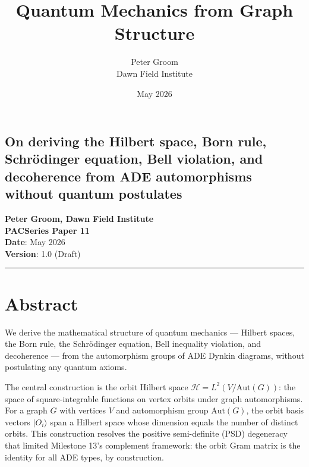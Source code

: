 \documentclass[11pt,a4paper]{article}
\title{Quantum Mechanics from Graph Structure}
\author{Peter Groom \\ Dawn Field Institute}
\date{May 2026}
\begin{document}
\maketitle

\subsection*{On deriving the Hilbert space, Born rule, Schrödinger equation, Bell violation, and decoherence from ADE automorphisms without quantum postulates}

\textbf{Peter Groom, Dawn Field Institute} \\
\textbf{PACSeries Paper 11} \\
\textbf{Date}: May 2026 \\
\textbf{Version}: 1.0 (Draft)

\begin{center}\rule{0.5\linewidth}{0.4pt}\end{center}

\section*{Abstract}

We derive the mathematical structure of quantum mechanics — Hilbert spaces, the Born rule, the Schrödinger equation, Bell inequality violation, and decoherence — from the automorphism groups of ADE Dynkin diagrams, without postulating any quantum axioms.

The central construction is the orbit Hilbert space $\mathcal{H} = L^2(V / \text{Aut}(G))$: the space of square-integrable functions on vertex orbits under graph automorphisms. For a graph $G$ with vertices $V$ and automorphism group $\text{Aut}(G)$, the orbit basis vectors $|O_i\rangle$ span a Hilbert space whose dimension equals the number of distinct orbits. This construction resolves the positive semi-definite (PSD) degeneracy that limited Milestone 13's complement framework: the orbit Gram matrix is the identity for all ADE types, by construction.
\end{document}
